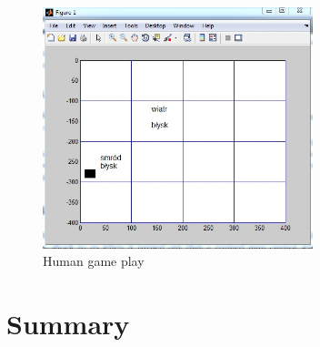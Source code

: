 \documentclass[a4paper]{article}
\begin{document}
\begin{figure}[!h]
		\centering	
		\includegraphics[width=0.7\textwidth]{pic/humanGame.jpg}
		\caption{Human game play}
		\label{pic:humanGame}
	\end{figure}

\section{Summary}
\end{document}
